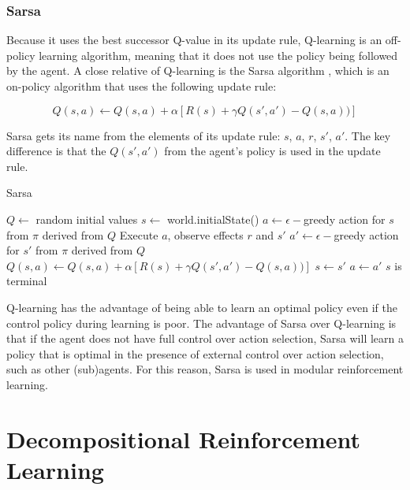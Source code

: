 \subsubsection{Sarsa}

Because it uses the best successor Q-value in its update rule, Q-learning is an off-policy learning algorithm, meaning that it does not use the policy being followed by the agent. A close relative of Q-learning is the Sarsa algorithm \cite{rummery1994online}, which is an on-policy algorithm that uses the following update rule:

\begin{equation}\label{eqn:sarsa-update}
Q(s, a) \leftarrow Q(s, a) + \alpha [R(s) + \gamma Q(s', a') - Q(s, a))]
\end{equation}

Sarsa gets its name from the elements of its update rule: $s$, $a$, $r$, $s'$, $a'$. The key difference is that the $Q(s', a')$ from the agent's policy is used in the update rule.

\begin{algorithm}
  \caption{Sarsa}\label{alg:sarsa}
  \begin{algorithmic}
    \State $Q \gets$ random initial values
      \State $s \gets$ world.initialState()
      \State $a \gets \epsilon-$greedy action for $s$ from $\pi$ derived from $Q$
      \Repeat
        \State Execute $a$, observe effects $r$ and $s'$
        \State $a' \gets \epsilon-$greedy action for $s'$ from $\pi$ derived from $Q$
        \State $Q(s, a) \gets Q(s, a) + \alpha [R(s) + \gamma Q(s', a') - Q(s, a))]$
        \State $s \gets s'$
        \State $a \gets a'$
      \Until $s$ is terminal
    \EndFor
  \end{algorithmic}
\end{algorithm}

Q-learning has the advantage of being able to learn an optimal policy even if the control policy during learning is poor. The advantage of Sarsa over Q-learning is that if the agent does not have full control over action selection, Sarsa will learn a policy that is optimal in the presence of external control over action selection, such as other (sub)agents. For this reason, Sarsa is used in modular reinforcement learning.

\section{Decompositional Reinforcement Learning}

